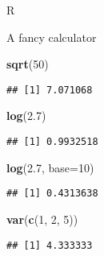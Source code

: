 \documentclass[ignorenonframetext,]{beamer}
\newenvironment{Shaded}{\begin{snugshade}}{\end{snugshade}}
\newcommand{\DataTypeTok}[1]{\textcolor[rgb]{0.13,0.29,0.53}{#1}}
\newcommand{\DecValTok}[1]{\textcolor[rgb]{0.00,0.00,0.81}{#1}}
\newcommand{\FloatTok}[1]{\textcolor[rgb]{0.00,0.00,0.81}{#1}}
\newcommand{\KeywordTok}[1]{\textcolor[rgb]{0.13,0.29,0.53}{\textbf{#1}}}
\newcommand{\NormalTok}[1]{#1}
\begin{document}
\begin{frame}[fragile]{R}
\protect\hypertarget{r-1}{}

A fancy calculator

\begin{Shaded}
\begin{Highlighting}[]
\KeywordTok{sqrt}\NormalTok{(}\DecValTok{50}\NormalTok{)}
\end{Highlighting}
\end{Shaded}

\begin{verbatim}
## [1] 7.071068
\end{verbatim}

\begin{Shaded}
\begin{Highlighting}[]
\KeywordTok{log}\NormalTok{(}\FloatTok{2.7}\NormalTok{)}
\end{Highlighting}
\end{Shaded}

\begin{verbatim}
## [1] 0.9932518
\end{verbatim}

\begin{Shaded}
\begin{Highlighting}[]
\KeywordTok{log}\NormalTok{(}\FloatTok{2.7}\NormalTok{, }\DataTypeTok{base=}\DecValTok{10}\NormalTok{)}
\end{Highlighting}
\end{Shaded}

\begin{verbatim}
## [1] 0.4313638
\end{verbatim}

\begin{Shaded}
\begin{Highlighting}[]
\KeywordTok{var}\NormalTok{(}\KeywordTok{c}\NormalTok{(}\DecValTok{1}\NormalTok{, }\DecValTok{2}\NormalTok{, }\DecValTok{5}\NormalTok{))}
\end{Highlighting}
\end{Shaded}

\begin{verbatim}
## [1] 4.333333
\end{verbatim}

\end{frame}
\end{document}
